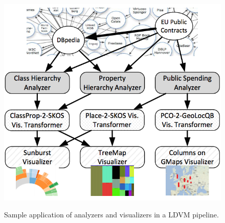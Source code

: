 \begin{figure}
\center
\includegraphics[scale=0.8]{img/ldvm-lod.png}
\label{fig:ldvm-lod}
\caption{Sample application of analyzers and visualizers in a LDVM pipeline.}
\end{figure}

